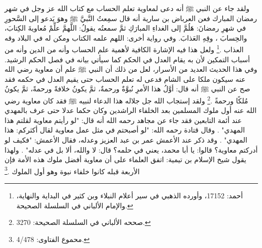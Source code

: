 ولقد جاء عن النبي ﷺ أنه دعى لمعاوية تعلم الحساب مع كتاب الله عز وجل في شهر رمضان المبارك فعن العرباض بن سارية أنه قال سمِعتُ النَّبيَّ ﷺ وهوَ يَدعو إلى السَّحورِ في شهرِ رمضانَ: هَلُمَّ إلى الغداءِ المبارَكِ ثمَّ سمعتُه يقولُ: اللَّهمَّ علِّمْ مُعاويةَ الكِتابَ، والحِسابَ ، وقِهِ العَذابَ. وفي رواية أخرى: اللهم علمه الكتاب ومكن له في البلاد وقه العذاب \href{https://shamela.ws/book/25794/13683#p2}{\faExternalLink}\href{https://shamela.ws/book/22669/1909#p2}{\faExternalLink}\href{https://shamela.ws/book/4445/6628#p1}{\faExternalLink}\href{https://shamela.ws/book/9442/5496#p12}{\faExternalLink} \cite{ahmid}\cite{dahabi_Siyar}\cite{ibnKathir_AlBidayah}\cite{albani_Sahiha}.\footnote{أحمد: 17152، وأورده الذهبي في سير أعلام النبلاء وبن كثير في البداية والنهاية، والإمام الألباني في السلسلة الصحيحة.} ولعل هذا فيه الإشارة الكافية لأهمية علم الحساب وأنه من الدين وأنه من أسباب التمكين لأن به يقام العدل في الحكم كما سيأتي بيانه في فصل الحكم الرشيد. وفي هذا الحديث العديد من الأسرار، لعل من ذلك أن النبي ﷺ علم أن معاوية رضي الله عنه سيكون ملكا على الشام فدعى له تعلم الحساب حتى يقيم العدل في حكمه فقد صح عن النبي ﷺ أنه قال: أوَّلُ هذا الأمرِ نُبوَّةٌ ورحمةٌ، ثمَّ يكونُ خلافةً ورحمةً، ثمَّ يكونُ مُلكًا ورحمةً \href{https://shamela.ws/book/9442/5496#p12}{\faExternalLink} \cite{albani_Sahiha}.\footnote{صححه الألباني في السلسلة الصحيحة: 3270.} ولقد إستجاب الله جل جلاله هذا الدعاء لنبيه ﷺ فقد كان معاوية رضي الله عنه أول ملوك المسلمين بعد الخلفاء الراشدين وكان حكما عدلا حتى عرف بالمهدي عند أئمة التابعين فقد جاء عن مجاهد رحمه الله أنه قال: "لو رأيتم معاوية لقلتم هذا المهدي" \href{https://shamela.ws/book/1077/702#p1}{\faExternalLink}. وقال قتادة رحمه الله: "لو أصبحتم في مثل عمل معاوية لقال أكثركم: هذا المهدي" \href{https://shamela.ws/book/1077/701#p1}{\faExternalLink}. وقد ذكر عند الأعمش عمر بن عبد العزيز وعدله، فقال الأعمش: "فكيف لو أدركتم معاوية؟ قالوا: يا أبا محمد، يعني في حلمه؟ قال: لا والله، ألا بل في عدله" \href{https://shamela.ws/book/1077/700#p1}{\faExternalLink} \href{https://shamela.ws/book/927/3063#p3}{\faExternalLink}. ولهذا يقول شيخ الإسلام بن تيمية: اتفق العلماء على أن معاوية أفضل ملوك هذه الأمة فإن الأربعة قبله كانوا خلفاء نبوة وهو أول الملوك \href{https://shamela.ws/book/7289/1800#p1}{\faExternalLink} \cite{ibnTaimia_Majmoo}.\footnote{محموع الفتاوى: 4/478.} 

